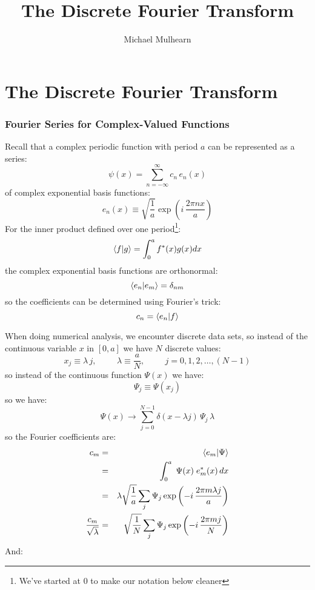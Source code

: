 \documentclass[12pt]{book}
\begin{document}
\title{The Discrete Fourier Transform \\} 
\author{Michael Mulhearn}

\maketitle

\appendix
\setcounter{chapter}{6}
\chapter{The Discrete Fourier Transform}

\subsection{Fourier Series for Complex-Valued Functions}

Recall that a complex periodic function with period $a$ can be represented as a series:
\begin{equation}
\psi(x) = \sum_{n=-\infty}^{\infty}  c_n \, e_n(x)
\end{equation}
of complex exponential basis functions:
\begin{equation}
e_n(x) \equiv \sqrt{\frac{1}{a}} \exp\left( i \, \frac{2 \pi n x}{a}\right)
\end{equation}
For the inner product defined over one period\footnote{We've started at 0 to make our notation below cleaner}:
\begin{equation}
\braket{f|g} = \int_{0}^{a} f^*(x) g(x) dx
\end{equation}
the complex exponential basis functions are orthonormal:
\begin{equation}
\braket{e_n|e_m} = \delta_{nm}
\end{equation}
so the coefficients can be determined using Fourier's trick:
\begin{equation}
c_n = \braket{e_n|f}
\end{equation}

When doing numerical analysis, we encounter discrete data sets, so instead of the continuous variable $x$ in $[0,a]$ we have $N$ discrete values:
$$x_j \equiv \lambda \, j, \hspace{1cm} \lambda \equiv \frac{a}{N}, \hspace{1cm} j=0,1,2,\ldots,(N-1)$$
so instead of the continuous function $\Psi(x)$ we have:
$$\Psi_j \equiv \Psi(x_j)$$
so we have:
$$\Psi(x) \to \sum_{j=0}^{N-1}\delta(x-\lambda j) \, \Psi_j \, \lambda $$
so the Fourier coefficients are:
\begin{eqnarray*}
c_m &=& \braket{e_m|\Psi}\\
&=& \int_{0}^{a} \; \Psi(x) \; e_m^*(x) \, dx \\
&=& \lambda \sqrt{\frac{1}{a}} \sum_j  \Psi_j \exp\left( -i \, \frac{2 \pi m \lambda j}{a}\right)\\
\frac{c_m}{\sqrt{\lambda}}&=& \sqrt{\frac{1}{N}} \sum_j  \Psi_j \exp\left( -i \, \frac{2 \pi m j}{N}\right)\\
\end{eqnarray*}
And:
\end{document}
